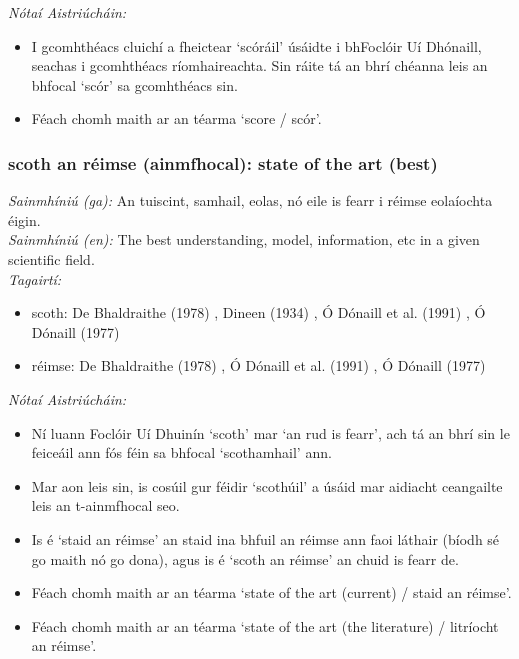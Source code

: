  \noindent \textit{Nótaí Aistriúcháin:}
\begin{itemize}
	\item I gcomhthéacs cluichí a fheictear `scóráil' úsáidte i bhFoclóir Uí Dhónaill, seachas i gcomhthéacs ríomhaireachta. Sin ráite tá an bhrí chéanna leis an bhfocal `scór' sa gcomhthéacs sin.
	\item Féach chomh maith ar an téarma `score / scór'.
\end{itemize}


\subsubsection*{scoth an réimse (ainmfhocal): state of the art (best)}
 \noindent \textit{Sainmhíniú (ga):} An tuiscint, samhail, eolas, nó eile is fearr i réimse eolaíochta éigin.
\\
 \noindent \textit{Sainmhíniú (en):} The best understanding, model, information, etc in a given scientific field.
\\
 \noindent \textit{Tagairtí:}
\begin{itemize}
	\item scoth: De Bhaldraithe (1978) \cite{de-bhaldraithe}, Dineen (1934) \cite{dineen}, Ó Dónaill et al. (1991) \cite{focloir-beag}, Ó Dónaill (1977) \cite{odonaill}
	\item réimse: De Bhaldraithe (1978) \cite{de-bhaldraithe}, Ó Dónaill et al. (1991) \cite{focloir-beag}, Ó Dónaill (1977) \cite{odonaill}
\end{itemize}

 \noindent \textit{Nótaí Aistriúcháin:}
\begin{itemize}
	\item Ní luann Foclóir Uí Dhuinín `scoth' mar `an rud is fearr', ach tá an bhrí sin le feiceáil ann fós féin sa bhfocal `scothamhail' ann.
	\item Mar aon leis sin, is cosúil gur féidir `scothúil' a úsáid mar aidiacht ceangailte leis an t-ainmfhocal seo.
	\item Is é `staid an réimse' an staid ina bhfuil an réimse ann faoi láthair (bíodh sé go maith nó go dona), agus is é `scoth an réimse' an chuid is fearr de.
	\item Féach chomh maith ar an téarma `state of the art (current) / staid an réimse'.
	\item Féach chomh maith ar an téarma `state of the art (the literature) / litríocht an réimse'.
\end{itemize}


